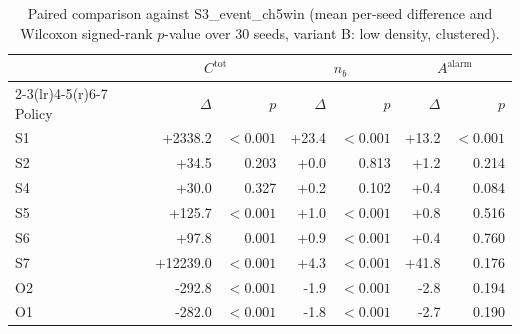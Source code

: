 \begin{table}[htbp]
\centering
\caption{Paired comparison against S3_event_ch5win (mean per-seed difference and
Wilcoxon signed-rank $p$-value over 30 seeds, variant B: low density, clustered).}
\label{tab:ch6-paired-B}
\begin{tabular}{@{}lrrrrrr@{}}
\toprule
& \multicolumn{2}{c}{$C^{\mathrm{tot}}$} & \multicolumn{2}{c}{$n_b$}
& \multicolumn{2}{c}{$A^{\mathrm{alarm}}$} \\
\cmidrule(r){2-3}\cmidrule(lr){4-5}\cmidrule(r){6-7}
Policy & $\Delta$ & $p$ & $\Delta$ & $p$ & $\Delta$ & $p$ \\
\midrule

S1 & +2338.2 & $<0.001$ & +23.4 & $<0.001$ & +13.2 & $<0.001$ \\
S2 & +34.5 & 0.203 & +0.0 & 0.813 & +1.2 & 0.214 \\
S4 & +30.0 & 0.327 & +0.2 & 0.102 & +0.4 & 0.084 \\
S5 & +125.7 & $<0.001$ & +1.0 & $<0.001$ & +0.8 & 0.516 \\
S6 & +97.8 & 0.001 & +0.9 & $<0.001$ & +0.4 & 0.760 \\
S7 & +12239.0 & $<0.001$ & +4.3 & $<0.001$ & +41.8 & 0.176 \\
O2 & -292.8 & $<0.001$ & -1.9 & $<0.001$ & -2.8 & 0.194 \\
O1 & -282.0 & $<0.001$ & -1.8 & $<0.001$ & -2.7 & 0.190 \\
\bottomrule
\end{tabular}
\end{table}
